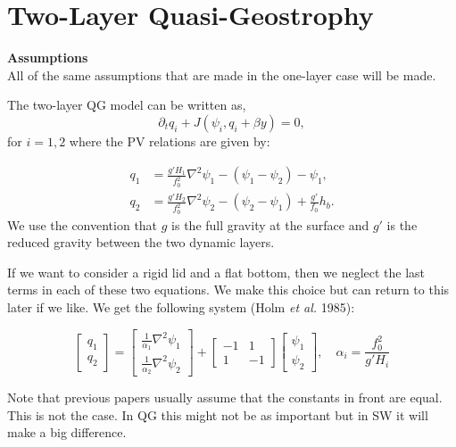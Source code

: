 \documentclass[12pt]{article}
\begin{document}
\newpage
\section{Two-Layer Quasi-Geostrophy}{
    \textbf{Assumptions} \\
    All of the same assumptions that are made in the one-layer case will be made.

    The two-layer QG model can be written as,
    $$
    \partial_t q_i + J(\psi_i, q_i + \beta y) = 0,
    $$
    for $i=1,2$ where the PV relations are given by:

    \begin{align*}
        q_1 &= \frac{g'H_1}{f_0^2}\nabla^2 \psi_1 - (\psi_1 - \psi_2) - \psi_1,\\
        q_2 &= \frac{g'H_2}{f_0^2}\nabla^2 \psi_2 - (\psi_2 - \psi_1) + \frac{g'}{f_0} h_b.
    \end{align*}
    We use the convention that $g$ is the full gravity at the surface and $g'$ is the reduced gravity between the two dynamic layers.

    If we want to consider a rigid lid and a flat bottom, then we neglect the last terms in each of these two equations.  We make this choice but can return to this later if we like. We get the following system (Holm \emph{et al.} 1985):

    \begin{equation}
        \left[\begin{array}{c}
        q_1 \\
        q_2
        \end{array}\right]
        =
        \left[\begin{array}{c}
        \frac{1}{\alpha_1}\nabla^2 \psi_1 \\
        \frac{1}{\alpha_2}\nabla^2 \psi_2
        \end{array}\right]
        +
        \left[\begin{array}{cc}
        -1 & 1 \\
        1 & -1
        \end{array}\right]
        \left[\begin{array}{c}
        \psi_1 \\
        \psi_2
        \end{array}\right],
        \quad \alpha_i = \frac{f_0^2}{g'H_i}
    \end{equation}

    Note that previous papers usually assume that the constants in front are equal. This is not the case.  In QG this might not be as important but in SW it will make a big difference.

}
\end{document}
